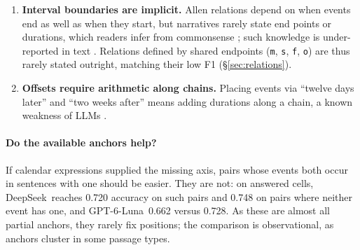 \documentclass[11pt]{article}
\newcommand{\rel}[1]{\texttt{#1}}
\newcommand{\Ds}{DeepSeek}
\newcommand{\Gp}{GPT-6-Luna}
\begin{document}
\begin{enumerate}[leftmargin=*,itemsep=1pt,topsep=2pt]
\item \textbf{Interval boundaries are implicit.} Allen relations depend on when events end as well as when they start, but narratives rarely state end points or durations, which readers infer from commonsense \citep{zhou-etal-2019-going}; such knowledge is under-reported in text \citep{zhou-etal-2020-temporal}. Relations defined by shared endpoints (\rel{m}, \rel{s}, \rel{f}, \rel{o}) are thus rarely stated outright, matching their low F1 (\S\ref{sec:relations}).
\item \textbf{Offsets require arithmetic along chains.} Placing events via ``twelve days later'' and ``two weeks after'' means adding durations along a chain, a known weakness of LLMs \citep{islakoglu-kalo-2025-chronosense,chu-etal-2024-timebench,wang-zhao-2024-tram}.
\end{enumerate}

\paragraph{Do the available anchors help?}
If calendar expressions supplied the missing axis, pairs whose events both occur in sentences with one should be easier. They are not: on answered cells, \Ds\ reaches 0.720 accuracy on such pairs and 0.748 on pairs where neither event has one, and \Gp\ 0.662 versus 0.728. As these are almost all partial anchors, they rarely fix positions; the comparison is observational, as anchors cluster in some passage types.
\end{document}
